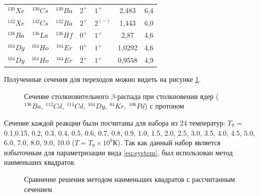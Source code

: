 \documentclass[14pt, a4paper]{article}
\begin{document}
\begin{table}
\begin{tabular}{|c|c|c|HHc|c|}
		$^{130}Xe$ & $^{130}Cs$ &$^{130}Ba$& $2^+$  &  $1^+$  & 2,483 &   6,4   \\
		$^{132}Xe$ & $^{132}Cs$ &$^{132}Ba$& $2^+$  &  $2^{(-)}$  & 1,443 &   6,0   \\
		$^{136}Ba$ & $^{136}La$ &$^{136}Hf$& $0^+$  &  $1^+$  & 2,87 &   4,6   \\
		$^{164}Dy$ & $^{164}Ho$ &$^{164}Er$& $0^+$  &  $1^+$  & 1,0292 &   4,6   \\
		$^{164}Dy$ & $^{164}Ho$ &$^{164}Er$& $2^+$  &  $1^+$  & 0,9558 &   4,9   \\
		\hline
	\end{tabular}
	\label{Tels}
\end{table}

Полученные сечения для переходов можно видеть на рисунке \ref{ris:sigma-full}.

\begin{figure}[ht]
	\caption{Сечение столкновительного $\beta$-распада при столкновении ядер ($^{136}Ba, \ ^{112}Cd, \ ^{114}Cd, \ ^{164}Dy, \ ^{84}Kr, \ ^{106}Pd$) с протоном}
	\label{ris:sigma-full}
\end{figure}

Сечение каждой реакции были посчитаны для набора из 24 температур: $T_9$ = 0.1,0.15, 0.2, 0.3, 0.4, 0.5, 0.6, 0.7, 0.8, 0.9, 1.0, 1.5, 2.0, 2.5, 3.0, 3.5, 4.0, 4.5, 5.0, 6.0, 7.0, 8.0, 9.0, 10.0 ($T = T_9 \times 10^{9}\text{К}$). Так как данный набор является избыточным для параметризации вида \ref{eq:system}, был использован метод наименьших квадратов. 

\begin{figure}[ht]
	\caption{Сравнение решения методом наименьших квадратов с рассчитанным сечением}
	\label{ris:2}
\end{figure}
\end{document}
